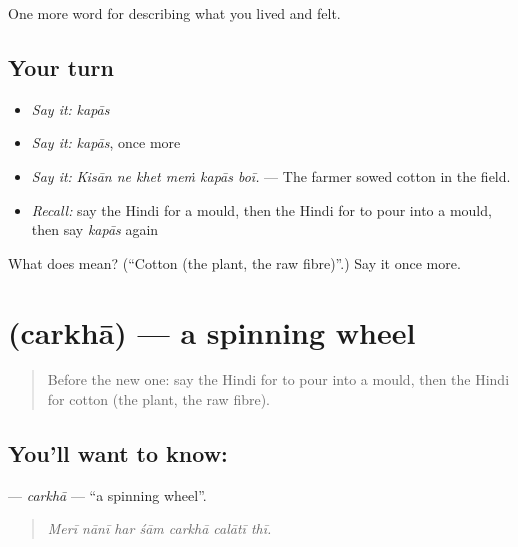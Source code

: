 \begin{grammarlens}[title={What you've built}]
One more word for describing what you lived and felt.
\end{grammarlens}

\subsection*{Your turn}
\begin{itemize}
\raggedright
  \item \emph{Say it:} \emph{kapās}
  \item \emph{Say it:} \emph{kapās}, once more
  \item \emph{Say it:} \emph{Kisān ne khet meṁ kapās boī.} — The farmer sowed cotton in the field.
  \item \emph{Recall:} say the Hindi for a mould, then the Hindi for to pour into a mould, then say \emph{kapās} again
\end{itemize}

\begin{tcolorbox}[breakable,colback=teal!4,colframe=teal!35!black,title={Before you move on}]
What does  mean? (\textquotedblleft{}Cotton (the plant, the raw fibre)\textquotedblright{}.) Say it once more.
\end{tcolorbox}
\section[\texorpdfstring{\hi{चरखा} (carkhā)}{चरखा (carkhā)}]{ (carkhā) — a spinning wheel}

\label{lesson:HI-C512-carkha}



\begin{quote}
Before the new one: say the Hindi for to pour into a mould, then the Hindi for cotton (the plant, the raw fibre).
\end{quote}

\subsection*{You'll want to know: }
\textbf{} — \emph{carkhā} — \textquotedblleft{}a spinning wheel\textquotedblright{}.

\begin{quote}
      
\end{quote}

\begin{quote}
\emph{Merī nānī har śām carkhā calātī thī.}
\end{quote}

